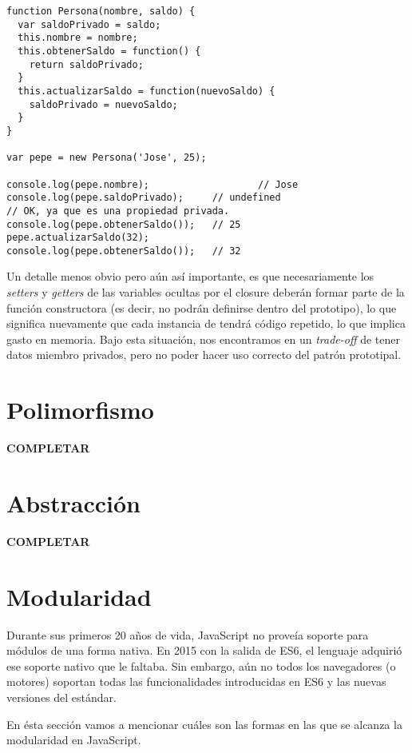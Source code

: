 \begin{lstlisting}[title={Alcanzando variables privadas mediante closures}]
function Persona(nombre, saldo) {
  var saldoPrivado = saldo;
  this.nombre = nombre;
  this.obtenerSaldo = function() {
    return saldoPrivado;
  }
  this.actualizarSaldo = function(nuevoSaldo) {
    saldoPrivado = nuevoSaldo;
  }
}

var pepe = new Persona('Jose', 25);

console.log(pepe.nombre);					// Jose
console.log(pepe.saldoPrivado);		// undefined
// OK, ya que es una propiedad privada.
console.log(pepe.obtenerSaldo());	// 25
pepe.actualizarSaldo(32);
console.log(pepe.obtenerSaldo());	// 32
\end{lstlisting}

Un detalle menos obvio pero aún así importante, es que necesariamente los \textit{setters} y \textit{getters} de las variables ocultas por el closure deberán formar parte de la función constructora (es decir, no podrán definirse dentro del prototipo), lo que significa nuevamente que cada instancia de  tendrá código repetido, lo que implica gasto en memoria. Bajo esta situación, nos encontramos en un \textit{trade-off} de tener datos miembro privados, pero no poder hacer uso correcto del patrón prototipal.

\section{Polimorfismo}

\textbf{COMPLETAR}

\section{Abstracción}

\textbf{COMPLETAR}

\section{Modularidad}

Durante sus primeros 20 años de vida, JavaScript no proveía soporte para módulos de una forma nativa. En 2015 con la salida de ES6, el lenguaje adquirió ese soporte nativo que le faltaba. Sin embargo, aún no todos los navegadores (o motores) soportan todas las funcionalidades introducidas en ES6 y las nuevas versiones del estándar.

En ésta sección vamos a mencionar cuáles son las formas en las que se alcanza la modularidad en JavaScript.

